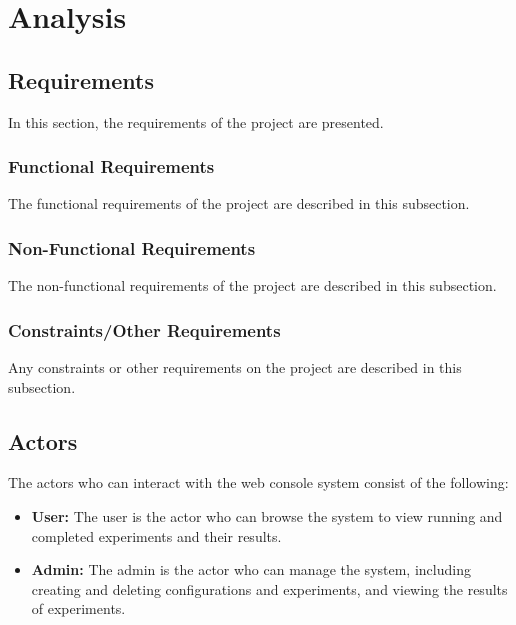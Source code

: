 \chapter{Analysis}\label{ch:analysis}


\section{Requirements}\label{sec:requirements}

In this section, the requirements of the project are presented.

\subsection{Functional Requirements}\label{subsec:functional-requirements}

The functional requirements of the project are described in this subsection.

\subsection{Non-Functional Requirements}\label{subsec:non-functional-requirements}

The non-functional requirements of the project are described in this subsection.

\subsection{Constraints/Other Requirements}\label{subsec:constraints/other-requirements}

Any constraints or other requirements on the project are described in this subsection.

\section{Actors}\label{sec:actors}

The actors who can interact with the web console system consist of the following:
\begin{itemize}
    \item \textbf{User:} The user is the actor who can browse the system to view running and completed experiments and their results.
    \item \textbf{Admin:} The admin is the actor who can manage the system, including creating and deleting configurations and experiments, and viewing the results of experiments.
\end{itemize}

